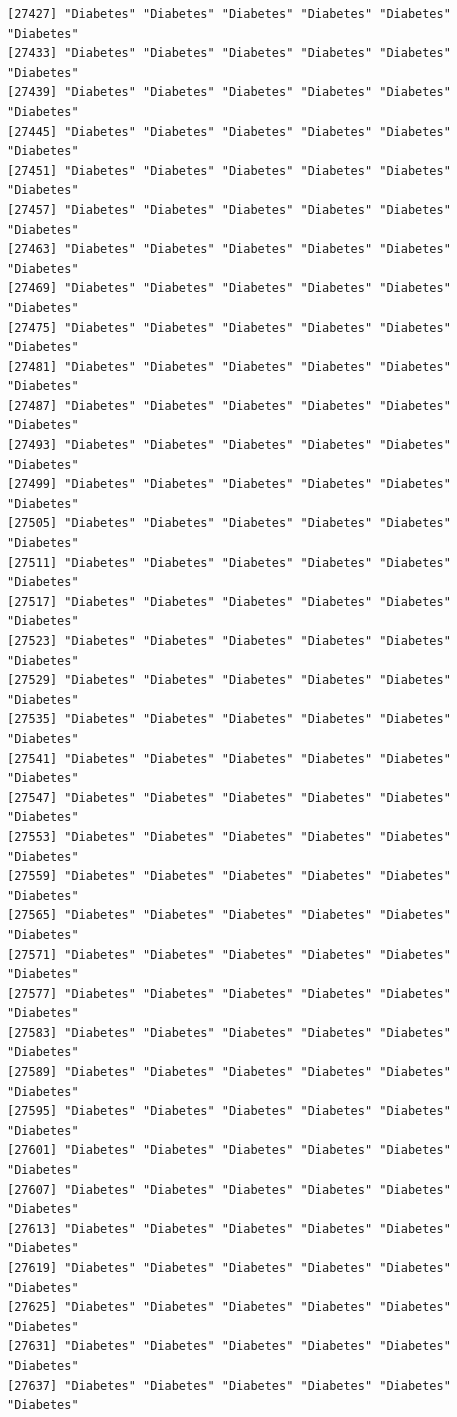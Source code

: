 \documentclass[
  letterpaper,
  DIV=11,
  numbers=noendperiod]{scrartcl}
\begin{document}
\begin{verbatim}
[27427] "Diabetes" "Diabetes" "Diabetes" "Diabetes" "Diabetes" "Diabetes"
[27433] "Diabetes" "Diabetes" "Diabetes" "Diabetes" "Diabetes" "Diabetes"
[27439] "Diabetes" "Diabetes" "Diabetes" "Diabetes" "Diabetes" "Diabetes"
[27445] "Diabetes" "Diabetes" "Diabetes" "Diabetes" "Diabetes" "Diabetes"
[27451] "Diabetes" "Diabetes" "Diabetes" "Diabetes" "Diabetes" "Diabetes"
[27457] "Diabetes" "Diabetes" "Diabetes" "Diabetes" "Diabetes" "Diabetes"
[27463] "Diabetes" "Diabetes" "Diabetes" "Diabetes" "Diabetes" "Diabetes"
[27469] "Diabetes" "Diabetes" "Diabetes" "Diabetes" "Diabetes" "Diabetes"
[27475] "Diabetes" "Diabetes" "Diabetes" "Diabetes" "Diabetes" "Diabetes"
[27481] "Diabetes" "Diabetes" "Diabetes" "Diabetes" "Diabetes" "Diabetes"
[27487] "Diabetes" "Diabetes" "Diabetes" "Diabetes" "Diabetes" "Diabetes"
[27493] "Diabetes" "Diabetes" "Diabetes" "Diabetes" "Diabetes" "Diabetes"
[27499] "Diabetes" "Diabetes" "Diabetes" "Diabetes" "Diabetes" "Diabetes"
[27505] "Diabetes" "Diabetes" "Diabetes" "Diabetes" "Diabetes" "Diabetes"
[27511] "Diabetes" "Diabetes" "Diabetes" "Diabetes" "Diabetes" "Diabetes"
[27517] "Diabetes" "Diabetes" "Diabetes" "Diabetes" "Diabetes" "Diabetes"
[27523] "Diabetes" "Diabetes" "Diabetes" "Diabetes" "Diabetes" "Diabetes"
[27529] "Diabetes" "Diabetes" "Diabetes" "Diabetes" "Diabetes" "Diabetes"
[27535] "Diabetes" "Diabetes" "Diabetes" "Diabetes" "Diabetes" "Diabetes"
[27541] "Diabetes" "Diabetes" "Diabetes" "Diabetes" "Diabetes" "Diabetes"
[27547] "Diabetes" "Diabetes" "Diabetes" "Diabetes" "Diabetes" "Diabetes"
[27553] "Diabetes" "Diabetes" "Diabetes" "Diabetes" "Diabetes" "Diabetes"
[27559] "Diabetes" "Diabetes" "Diabetes" "Diabetes" "Diabetes" "Diabetes"
[27565] "Diabetes" "Diabetes" "Diabetes" "Diabetes" "Diabetes" "Diabetes"
[27571] "Diabetes" "Diabetes" "Diabetes" "Diabetes" "Diabetes" "Diabetes"
[27577] "Diabetes" "Diabetes" "Diabetes" "Diabetes" "Diabetes" "Diabetes"
[27583] "Diabetes" "Diabetes" "Diabetes" "Diabetes" "Diabetes" "Diabetes"
[27589] "Diabetes" "Diabetes" "Diabetes" "Diabetes" "Diabetes" "Diabetes"
[27595] "Diabetes" "Diabetes" "Diabetes" "Diabetes" "Diabetes" "Diabetes"
[27601] "Diabetes" "Diabetes" "Diabetes" "Diabetes" "Diabetes" "Diabetes"
[27607] "Diabetes" "Diabetes" "Diabetes" "Diabetes" "Diabetes" "Diabetes"
[27613] "Diabetes" "Diabetes" "Diabetes" "Diabetes" "Diabetes" "Diabetes"
[27619] "Diabetes" "Diabetes" "Diabetes" "Diabetes" "Diabetes" "Diabetes"
[27625] "Diabetes" "Diabetes" "Diabetes" "Diabetes" "Diabetes" "Diabetes"
[27631] "Diabetes" "Diabetes" "Diabetes" "Diabetes" "Diabetes" "Diabetes"
[27637] "Diabetes" "Diabetes" "Diabetes" "Diabetes" "Diabetes" "Diabetes"

\end{verbatim}
\end{document}
